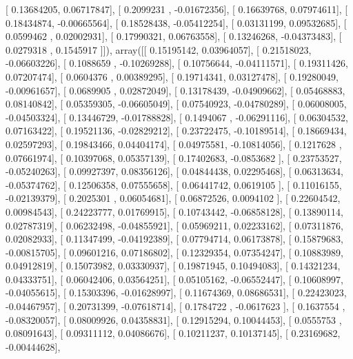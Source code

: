 \documentclass{article}
\begin{document}
       [ 0.13684205,  0.06717847],
       [ 0.2099231 , -0.01672356],
       [ 0.16639768,  0.07974611],
       [ 0.18434874, -0.00665564],
       [ 0.18528438, -0.05412254],
       [ 0.03131199,  0.09532685],
       [ 0.0599462 ,  0.02002931],
       [ 0.17990321,  0.06763558],
       [ 0.13246268, -0.04373483],
       [ 0.0279318 ,  0.1545917 ]]), array([[ 0.15195142,  0.03964057],
       [ 0.21518023, -0.06603226],
       [ 0.1088659 , -0.10269288],
       [ 0.10756644, -0.04111571],
       [ 0.19311426,  0.07207474],
       [ 0.0604376 ,  0.00389295],
       [ 0.19714341,  0.03127478],
       [ 0.19280049, -0.00961657],
       [ 0.0689905 ,  0.02872049],
       [ 0.13178439, -0.04909662],
       [ 0.05468883,  0.08140842],
       [ 0.05359305, -0.06605049],
       [ 0.07540923, -0.04780289],
       [ 0.06008005, -0.04503324],
       [ 0.13446729, -0.01788828],
       [ 0.1494067 , -0.06291116],
       [ 0.06304532,  0.07163422],
       [ 0.19521136, -0.02829212],
       [ 0.23722475, -0.10189514],
       [ 0.18669434,  0.02597293],
       [ 0.19843466,  0.04404174],
       [ 0.04975581, -0.10814056],
       [ 0.1217628 ,  0.07661974],
       [ 0.10397068,  0.05357139],
       [ 0.17402683, -0.0853682 ],
       [ 0.23753527, -0.05240263],
       [ 0.09927397,  0.08356126],
       [ 0.04844438,  0.02295468],
       [ 0.06313634, -0.05374762],
       [ 0.12506358,  0.07555658],
       [ 0.06441742,  0.0619105 ],
       [ 0.11016155, -0.02139379],
       [ 0.2025301 ,  0.06054681],
       [ 0.06872526,  0.0094102 ],
       [ 0.22604542,  0.00984543],
       [ 0.24223777,  0.01769915],
       [ 0.10743442, -0.06858128],
       [ 0.13890114,  0.02787319],
       [ 0.06232498, -0.04855921],
       [ 0.05969211,  0.02233162],
       [ 0.07311876,  0.02082933],
       [ 0.11347499, -0.04192389],
       [ 0.07794714,  0.06173878],
       [ 0.15879683, -0.00815705],
       [ 0.09601216,  0.07186802],
       [ 0.12329354,  0.07354247],
       [ 0.10883989,  0.04912819],
       [ 0.15073982,  0.03330937],
       [ 0.19871945,  0.10494083],
       [ 0.14321234,  0.04333751],
       [ 0.06042406,  0.03564251],
       [ 0.05105162, -0.06552447],
       [ 0.10608997, -0.04055615],
       [ 0.15303396, -0.01628997],
       [ 0.11674369,  0.08686531],
       [ 0.22423023, -0.04467957],
       [ 0.20731399, -0.07618714],
       [ 0.1784722 , -0.0617623 ],
       [ 0.1637554 , -0.08320057],
       [ 0.08009926,  0.04358831],
       [ 0.12915294,  0.10044453],
       [ 0.0555753 ,  0.08091643],
       [ 0.09311112,  0.04086676],
       [ 0.10211237,  0.10137145],
       [ 0.23169682, -0.00444628],
\end{document}
